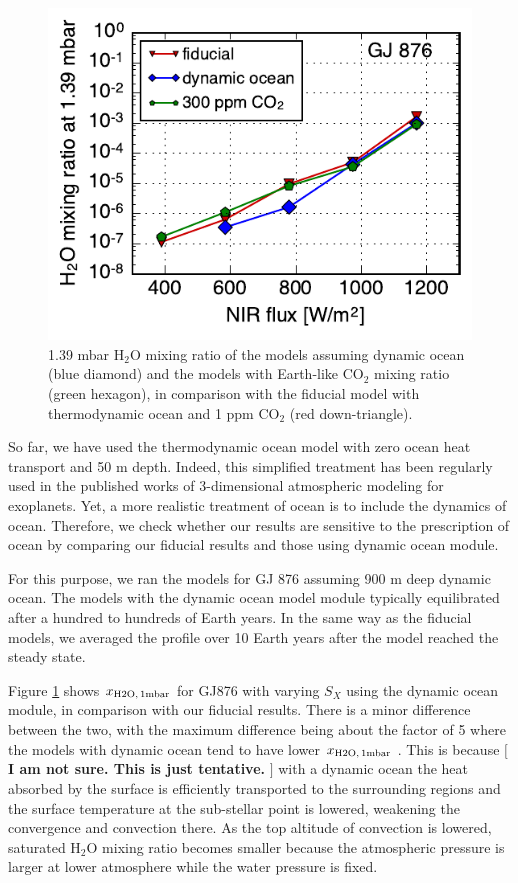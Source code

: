 \documentclass[11pt,numberedappendix,twocolappendix,]{emulateapj}
\def\water{H$_2$O }
\def\xwater{$x_{\rm H2O,\,1mbar}$ }
\def\memo#1{\color{red}$[${\bf #1}$]$ \color{black}}
\begin{document}
\begin{figure}[!h]
    \begin{center}
    \includegraphics[width=0.7\hsize]{fig/xH2O_sensitivity.pdf}
    \end{center}
\caption{1.39 mbar \water mixing ratio of the models assuming dynamic ocean (blue diamond) and the models with Earth-like CO$_2$ mixing ratio (green hexagon), in comparison with the fiducial model with thermodynamic ocean and 1 ppm CO$_2$ (red down-triangle). }
\label{fig:change_ocean}
\end{figure}

So far, we have used the thermodynamic ocean model with zero ocean heat transport and 50 m depth. 
Indeed, this simplified treatment has been regularly used in the published works of 3-dimensional atmospheric modeling for exoplanets. 
Yet, a more realistic treatment of ocean is to include the dynamics of ocean. 
Therefore, we check whether our results are sensitive to the prescription of ocean by comparing our fiducial results and those using dynamic ocean module. 

For this purpose, we ran the models for GJ 876 assuming 900 m deep dynamic ocean. 
The models with the dynamic ocean model module typically equilibrated after a hundred to hundreds of Earth years. 
In the same way as the fiducial models, we averaged the profile over 10 Earth years after the model reached the steady state. 

Figure \ref{fig:change_ocean} shows \xwater for GJ876 with varying $S_X$ using the dynamic ocean module, in comparison with our fiducial results.  
There is a minor difference between the two, with the maximum difference being about the factor of 5 where the models with dynamic ocean tend to have lower \xwater. 
This is because \memo{I am not sure. This is just tentative. } with a dynamic ocean the heat absorbed by the surface is efficiently transported to the surrounding regions and the surface temperature at the sub-stellar point is lowered, weakening the convergence and convection there.
As the top altitude of convection is lowered, saturated \water mixing ratio becomes smaller because the atmospheric pressure is larger at lower atmosphere while the water pressure is fixed. 
\end{document}
